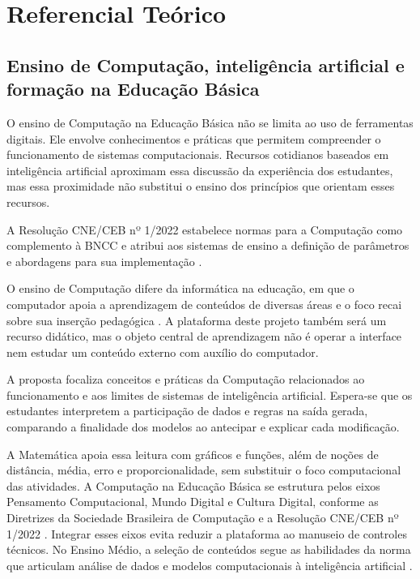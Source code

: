 \chapter{Referencial Teórico}

\section{Ensino de Computação, inteligência artificial e formação na Educação Básica}

O ensino de Computação na Educação Básica não se limita ao uso de ferramentas digitais. Ele envolve conhecimentos e práticas que permitem compreender o funcionamento de sistemas computacionais. Recursos cotidianos baseados em inteligência artificial aproximam essa discussão da experiência dos estudantes, mas essa proximidade não substitui o ensino dos princípios que orientam esses recursos.

A Resolução CNE/CEB nº 1/2022 estabelece normas para a Computação como complemento à BNCC e atribui aos sistemas de ensino a definição de parâmetros e abordagens para sua implementação \cite{brasil2022computacao}.

O ensino de Computação difere da informática na educação, em que o computador apoia a aprendizagem de conteúdos de diversas áreas e o foco recai sobre sua inserção pedagógica \cite{valente2002uso}. A plataforma deste projeto também será um recurso didático, mas o objeto central de aprendizagem não é operar a interface nem estudar um conteúdo externo com auxílio do computador.

A proposta focaliza conceitos e práticas da Computação relacionados ao funcionamento e aos limites de sistemas de inteligência artificial. Espera-se que os estudantes interpretem a participação de dados e regras na saída gerada, comparando a finalidade dos modelos ao antecipar e explicar cada modificação.

A Matemática apoia essa leitura com gráficos e funções, além de noções de distância, média, erro e proporcionalidade, sem substituir o foco computacional das atividades. A Computação na Educação Básica se estrutura pelos eixos Pensamento Computacional, Mundo Digital e Cultura Digital, conforme as Diretrizes da Sociedade Brasileira de Computação e a Resolução CNE/CEB nº 1/2022 \cite{sbc2018diretrizes,brasil2022computacao}. Integrar esses eixos evita reduzir a plataforma ao manuseio de controles técnicos. No Ensino Médio, a seleção de conteúdos segue as habilidades da norma que articulam análise de dados e modelos computacionais à inteligência artificial \cite{brasil2022computacao}.

